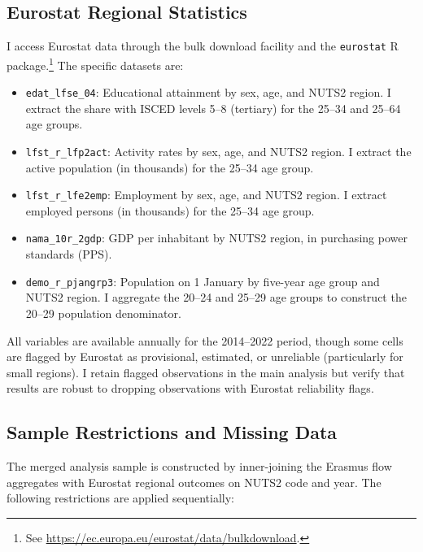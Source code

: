 \documentclass[12pt]{article}
\begin{document}
\subsection{Eurostat Regional Statistics}

I access Eurostat data through the bulk download facility and the \texttt{eurostat} R package.\footnote{See \url{https://ec.europa.eu/eurostat/data/bulkdownload}.} The specific datasets are:

\begin{itemize}
    \item \texttt{edat\_lfse\_04}: Educational attainment by sex, age, and NUTS2 region. I extract the share with ISCED levels 5--8 (tertiary) for the 25--34 and 25--64 age groups.
    \item \texttt{lfst\_r\_lfp2act}: Activity rates by sex, age, and NUTS2 region. I extract the active population (in thousands) for the 25--34 age group.
    \item \texttt{lfst\_r\_lfe2emp}: Employment by sex, age, and NUTS2 region. I extract employed persons (in thousands) for the 25--34 age group.
    \item \texttt{nama\_10r\_2gdp}: GDP per inhabitant by NUTS2 region, in purchasing power standards (PPS).
    \item \texttt{demo\_r\_pjangrp3}: Population on 1 January by five-year age group and NUTS2 region. I aggregate the 20--24 and 25--29 age groups to construct the 20--29 population denominator.
\end{itemize}

All variables are available annually for the 2014--2022 period, though some cells are flagged by Eurostat as provisional, estimated, or unreliable (particularly for small regions). I retain flagged observations in the main analysis but verify that results are robust to dropping observations with Eurostat reliability flags.

\subsection{Sample Restrictions and Missing Data}

The merged analysis sample is constructed by inner-joining the Erasmus flow aggregates with Eurostat regional outcomes on NUTS2 code and year. The following restrictions are applied sequentially:
\end{document}
